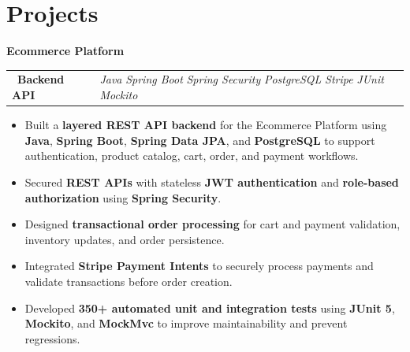 \documentclass[letterpaper,11pt]{article}
\makeatletter
\newcommand{\resumeItem}[1]{\item\small{{#1 \vspace{-2pt}}}}
\newcommand{\resumeProjectSubheading}[3]{
    \vspace{0pt}
    \begin{tabular*}{\textwidth}{@{}p{0.42\textwidth}@{\extracolsep{\fill}}p{0.56\textwidth}@{}}
        \hspace{0.07in}\textbullet\ \textbf{#1}\hspace{4pt}\raisebox{0.12ex}{\footnotesize #2}
        &
        \raggedleft\footnotesize\emph{#3}
    \end{tabular*}
    \vspace{-18pt}
}
\newcommand{\resumeProjectItemListStart}{
\begin{itemize}[
leftmargin=0.30in,
label=\textbullet,
itemsep=2pt,
topsep=4.75pt,
parsep=0pt,
partopsep=0pt
]
}
\newcommand{\resumeItemListEnd}{\end{itemize}\vspace{-2pt}}
\makeatother
\begin{document}
\section{Projects}

{\bfseries\normalsize Ecommerce Platform}
\vspace{1.5pt}
\resumeProjectSubheading
{Backend API}
{\href{https://github.com/Dhanno98/Ecommerce-Backend}{[Link]}}
{Java\,\hspace{0.05cm}\textbar\hspace{0.05cm}\,Spring Boot\,\hspace{0.05cm}\textbar\hspace{0.05cm}\,Spring Security\,\hspace{0.05cm}\textbar\hspace{0.05cm}\,PostgreSQL\,\hspace{0.05cm}\textbar\hspace{0.05cm}\,Stripe\,\hspace{0.05cm}\textbar\hspace{0.05cm}\,JUnit\,\hspace{0.05cm}\textbar\hspace{0.05cm}\,Mockito}
\resumeProjectItemListStart
\resumeItem{
Built a \textbf{layered REST API backend} for the Ecommerce Platform using \textbf{Java}, \textbf{Spring Boot}, \textbf{Spring Data JPA}, and \textbf{PostgreSQL} to support authentication, product catalog, cart, order, and payment workflows.
}
\resumeItem{
Secured \textbf{REST APIs} with stateless \textbf{JWT authentication} and \textbf{role-based authorization} using \textbf{Spring Security}.
}
\resumeItem{
Designed \textbf{transactional order processing} for cart and payment validation, inventory updates, and order persistence.
}
\resumeItem{
Integrated \textbf{Stripe Payment Intents} to securely process payments and validate transactions before order creation.
}
\resumeItem{
Developed \textbf{350+ automated unit and integration tests} using \textbf{JUnit 5}, \textbf{Mockito}, and \textbf{MockMvc} to improve maintainability and prevent regressions.
}
\resumeItemListEnd
\vspace{1pt}
\end{document}
